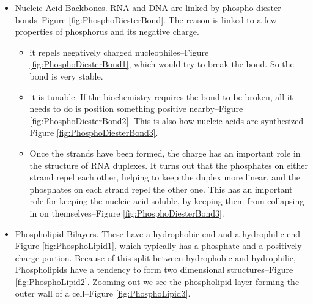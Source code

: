 \documentclass[]{article}
\begin{document}
\begin{itemize}
	\item Nucleic Acid Backbones. RNA and DNA are linked by phospho-diester bonds--Figure \ref{fig:PhosphoDiesterBond}. The reason is linked to a few properties of phosphorus and its negative charge.
	\begin{itemize}
		\item it repels negatively charged nucleophiles--Figure \ref{fig:PhosphoDiesterBond1}, which would try to break the bond. So the bond is very stable.
		\item it is tunable. If the biochemistry requires the bond to be broken, all it needs to do is position something positive nearby--Figure \ref{fig:PhosphoDiesterBond2}. This is also how nucleic acids are synthesized--Figure \ref{fig:PhosphoDiesterBond3}.
		\item Once the strands have been formed, the charge has an important role in the structure of RNA duplexes. It turns out that the phosphates on either strand repel each other, helping to keep the duplex more linear, and the phosphates on each strand repel the other one. This has an important role for keeping the nucleic acid soluble, by keeping them from collapsing in on themselves--Figure \ref{fig:PhosphoDiesterBond3}.
	\end{itemize}
	\item Phospholipid Bilayers. These have a hydrophobic end and a hydrophilic end--Figure \ref{fig:PhosphoLipid1}, which typically has a phosphate and a positively charge portion. Because of this split between hydrophobic and hydrophilic, Phospholipids have a tendency to form two dimensional structures--Figure \ref{fig:PhosphoLipid2}. Zooming out we see the phospholipid layer forming the outer wall of a cell--Figure \ref{fig:PhosphoLipid3}.
\end{itemize}
\end{document}
